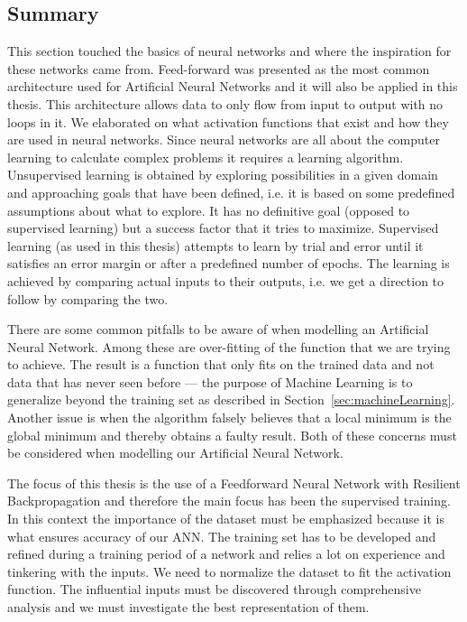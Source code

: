 \subsection{Summary}
This section touched the basics of neural networks and where the inspiration for these networks came from. Feed-forward was presented as the most common architecture used for Artificial Neural Networks and it will also be applied in this thesis. This architecture allows data to only flow from input to output with no loops in it. We elaborated on what activation functions that exist and how they are used in neural networks. Since neural networks are all about the computer learning to calculate complex problems it requires a learning algorithm. Unsupervised learning is obtained by exploring possibilities in a given domain and approaching goals that have been defined, i.e. it is based on some predefined assumptions about what to explore. It has no definitive goal (opposed to supervised learning) but a success factor that it tries to maximize. Supervised learning (as used in this thesis) attempts to learn by trial and error until it satisfies an error margin or after a predefined number of epochs. The learning is achieved by comparing actual inputs to their outputs, i.e. we get a direction to follow by comparing the two.

There are some common pitfalls to be aware of when modelling an Artificial Neural Network. Among these are over-fitting of the function that we are trying to achieve. The result is a function that only fits on the trained data and not data that has never seen before --- the purpose of Machine Learning is to generalize beyond the training set as described in Section~\ref{sec:machineLearning}. Another issue is when the algorithm falsely believes that a local minimum is the global minimum and thereby obtains a faulty result. Both of these concerns must be considered when modelling our Artificial Neural Network.

The focus of this thesis is the use of a Feedforward Neural Network with Resilient Backpropagation and therefore the main focus has been the supervised training. In this context the importance of the dataset must be emphasized because it is what ensures accuracy of our ANN. The training set has to be developed and refined during a training period of a network and relies a lot on experience and tinkering with the inputs. We need to normalize the dataset to fit the activation function. The influential inputs must be discovered through comprehensive analysis and we must investigate the best representation of them.